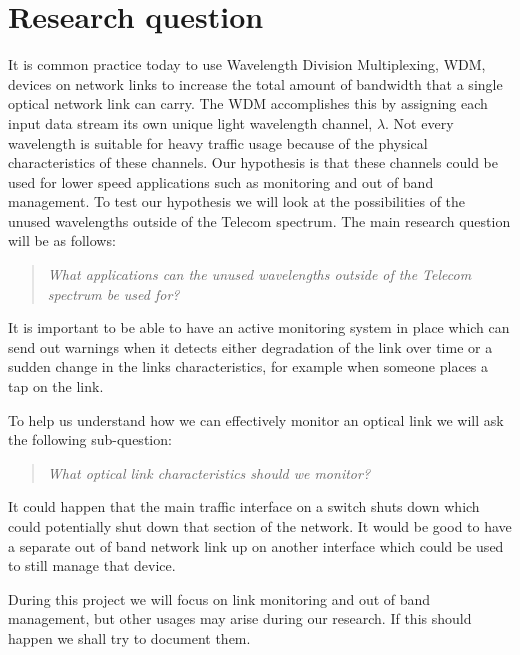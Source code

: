 \documentclass{article}
\begin{document}
\section{Research question}
It is common practice today to use Wavelength Division Multiplexing, WDM, devices on network links to increase the total amount of bandwidth that a single optical network link can carry. The WDM accomplishes this by assigning each input data stream its own unique light wavelength channel, $\lambda$. 
Not every wavelength is suitable for heavy traffic usage because of the physical characteristics of these channels. Our hypothesis is that these channels could be used for lower speed applications such as monitoring and out of band management.
To test our hypothesis we will look at the possibilities of the unused wavelengths outside of the Telecom spectrum.
The main research question will be as follows:
\begin{quote}
\textit{
What applications can the unused wavelengths outside of the Telecom spectrum be used for?
}
\end{quote}

It is important to be able to have an active monitoring system in place which can send out warnings when it detects either degradation of the link over time or a sudden change in the links characteristics, for example when someone places a tap on the link. 

To help us understand how we can effectively monitor an optical link we will ask the following sub-question:
\begin{quote}
\textit{
What optical link characteristics should we monitor?
}
\end{quote}

It could happen that the main traffic interface on a switch shuts down which could potentially shut down that section of the network.
It would be good to have a separate out of band network link up on another interface which could be used to still manage that device.

During this project we will focus on link monitoring and out of band management, but other usages may arise during our research.
If this should happen we shall try to document them.

\newpage
\end{document}
